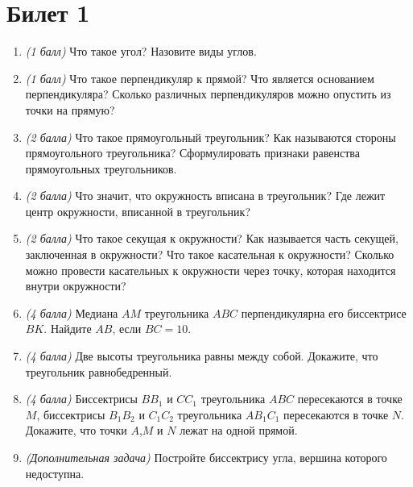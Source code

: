 \documentclass[12pt, a4paper]{article}
\begin{document}
\section*{Билет 1}
\begin{enumerate}
	\item \textit{(1 балл)} Что такое угол? Назовите виды углов.
	\item \textit{(1 балл)} Что такое перпендикуляр к прямой? Что является основанием перпендикуляра? Сколько различных перпендикуляров можно опустить из точки на прямую?
	\item \textit{(2 балла)} Что такое прямоугольный треугольник? Как называются стороны прямоугольного треугольника? Сформулировать признаки равенства прямоугольных треугольников.
	\item \textit{(2 балла)} Что значит, что окружность вписана в треугольник? Где лежит центр окружности, вписанной в треугольник?
	\item \textit{(2 балла)} Что такое секущая к окружности? Как называется часть секущей, заключенная в окружности? Что такое касательная к окружности? Сколько можно провести касательных к окружности через точку, которая находится внутри окружности?
	\item \textit{(4 балла)} Медиана $AM$ треугольника $ABC$ перпендикулярна его биссектрисе $BK$. Найдите $AB$, если $BC = 10$.
	\item \textit{(4 балла)} Две высоты треугольника равны между собой. Докажите, что треугольник равнобедренный.
	\item \textit{(4 балла)} Биссектрисы $BB_1$ и $CC_1$ треугольника $ABC$ пересекаются в точке $M$, биссектрисы $B_1B_2$ и $C_1C_2$ треугольника $AB_1C_1$ пересекаются в точке $N$. Докажите, что точки $A$,$M$ и $N$ лежат на одной прямой.
	\item \textit{(Дополнительная задача)} Постройте биссектрису угла, вершина которого недоступна.
\end{enumerate}
\end{document}
